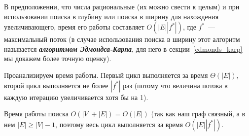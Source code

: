 \begin{comment}
\draw (195,107.4) node [anchor=north west][inner sep=0.75pt]    {$v_{1}$};
\draw (366,28.4) node [anchor=north west][inner sep=0.75pt]    {$s$};
\draw (367,177.4) node [anchor=north west][inner sep=0.75pt]    {$t$};
\draw (303,105.4) node [anchor=north west][inner sep=0.75pt]    {$v_{2}$};
\draw (413,104.4) node [anchor=north west][inner sep=0.75pt]    {$v_{3}$};
\draw (518,104.4) node [anchor=north west][inner sep=0.75pt]    {$v_{4}$};
\draw (333,59.4) node [anchor=north west][inner sep=0.75pt]    {$3$};
\draw (264,45.4) node [anchor=north west][inner sep=0.75pt]    {$3$};
\draw (462,45.4) node [anchor=north west][inner sep=0.75pt]    {$3$};
\draw (254,93.4) node [anchor=north west][inner sep=0.75pt]    {$1$};
\draw (359,92.4) node [anchor=north west][inner sep=0.75pt]    {$1$};
\draw (454,145.4) node [anchor=north west][inner sep=0.75pt]    {$3$};
\draw (378,132.4) node [anchor=north west][inner sep=0.75pt]    {$3$};
\draw (266,163.4) node [anchor=north west][inner sep=0.75pt]    {$3$};
\draw (445,88.4) node [anchor=north west][inner sep=0.75pt]    {$c=\frac{\sqrt{5} -1}{2}$};
\end{tikzpicture}
\end{center}

Величина максимального потока в этой сети равна $7=2\cdot3+1$ (на ребрах $s\to v_1\to t$ и $s\to v_4\to t$ его значение 3, на ребрах $s\to v_2\to v_3\to t$ его значение 1). 
\end{example}
\end{comment}

В предположении, что числа рациональные (их можно свести к целым) и при использовании поиска в глубину или поиска в ширину для нахождения увеличивающего, время его работы составляет $O(|E||f^*|)$, где $f^*$~--- максимальный поток (в случае использования поиска в ширину этот алгоритм называется {\bf\it алгоритмом Эдмондса-Карпа}, для него в секции~\ref{edmonds_karp} мы докажем более точную оценку).

Проанализируем время работы. Первый цикл выполняется за время $\Theta(|E|)$, второй цикл выполняется не более $|f^*|$ раз (потому что величина потока в каждую итерацию увеличивается хотя бы на 1).

Время работы поиска $O(|V|+|E|)=O(|E|)$ (так как наш граф связный, а в нем $|E|\ge |V|-1$, поэтому весь цикл выполняется за время $O(|E||f^*|)$.

